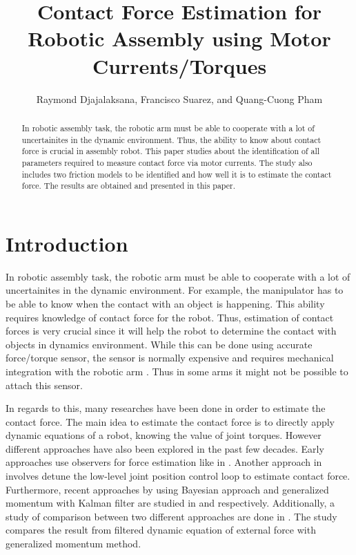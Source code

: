 \documentclass[letterpaper, 10 pt, conference]{ieeeconf}
\title{\LARGE \bf{}
Contact Force Estimation for Robotic Assembly using Motor Currents/Torques
}
\author{Raymond Djajalaksana, Francisco Suarez, and Quang-Cuong Pham}
\begin{document}
\maketitle
\pagestyle{plain}
\thispagestyle{plain}

\begin{abstract}
In robotic assembly task, the robotic arm must be able to cooperate with a lot of uncertainites in the dynamic environment. Thus, the ability to know about contact force is crucial in assembly robot. This paper studies about the identification of all parameters required to measure contact force via motor currents. The study also includes two friction models to be identified and how well it is to estimate the contact force. The results are obtained and presented in this paper. 


\end{abstract}

      \section{Introduction}
In robotic assembly task, the robotic arm must be able to cooperate with a lot of uncertainites in the dynamic environment. For example, the manipulator has to be able to know when the contact with an object is happening. This ability requires knowledge of contact force for the robot. Thus, estimation of contact forces is very crucial since it will help the robot to determine the contact with objects in dynamics environment. While this can be done using accurate force/torque sensor, the sensor is normally expensive and requires mechanical integration with the robotic arm \cite{Hao15}. Thus in some arms it might not be possible to attach this sensor.   

In regards to this, many researches have been done in order to estimate the contact force. The main idea to estimate the contact force is to directly apply dynamic equations of a robot, knowing the value of joint torques. However different approaches have also been explored in the past few decades. Early approaches use observers for force estimation like in \cite{Ohi91}. Another approach in \cite{Stolt12} involves detune the low-level joint position control loop to estimate contact force. Furthermore, recent approaches by using Bayesian approach and generalized momentum with Kalman filter are studied in \cite{Hao14} and \cite{Hao15} respectively. Additionally, a study of comparison between two different approaches are done in \cite{Beyl11}. The study compares the result from filtered dynamic equation of external force with generalized momentum method.
\end{document}
